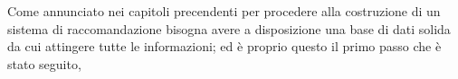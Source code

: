 Come annunciato nei capitoli precendenti per procedere alla costruzione di un sistema di raccomandazione bisogna avere a disposizione
una base di dati solida da cui attingere tutte le informazioni; ed è proprio questo il primo passo che è stato seguito, 







